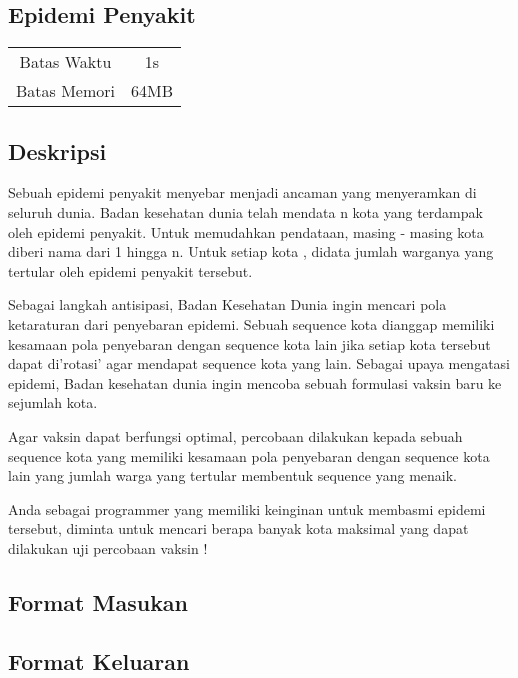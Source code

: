 \documentclass{article}
\begin{document}
\begin{center}
    \section*{Epidemi Penyakit} %

    \begin{tabular}{ | c c | }
        \hline
        Batas Waktu  & 1s \\    %
        Batas Memori & 64MB \\  %
        \hline
    \end{tabular}
\end{center}

\subsection*{Deskripsi}

Sebuah epidemi penyakit menyebar menjadi ancaman yang menyeramkan di seluruh dunia.
Badan kesehatan dunia telah mendata n kota yang terdampak oleh epidemi penyakit.
Untuk memudahkan pendataan, masing - masing kota diberi nama dari 1 hingga n. 
Untuk setiap kota , didata jumlah warganya yang tertular oleh epidemi penyakit tersebut.

Sebagai langkah antisipasi, Badan Kesehatan Dunia ingin mencari pola ketaraturan dari penyebaran epidemi.
Sebuah sequence kota dianggap memiliki kesamaan pola penyebaran dengan sequence kota lain jika 
setiap kota tersebut dapat di'rotasi' agar mendapat sequence kota yang lain. 
Sebagai upaya mengatasi epidemi, Badan kesehatan dunia ingin mencoba sebuah formulasi vaksin baru ke sejumlah kota.

Agar vaksin dapat berfungsi optimal, percobaan dilakukan kepada sebuah sequence kota yang memiliki kesamaan pola penyebaran dengan sequence kota lain yang jumlah warga yang tertular membentuk sequence yang menaik.

Anda sebagai programmer yang memiliki keinginan untuk membasmi epidemi tersebut, 
diminta untuk mencari berapa banyak kota maksimal yang dapat dilakukan uji percobaan vaksin !

\subsection*{Format Masukan}



\subsection*{Format Keluaran}
\end{document}
